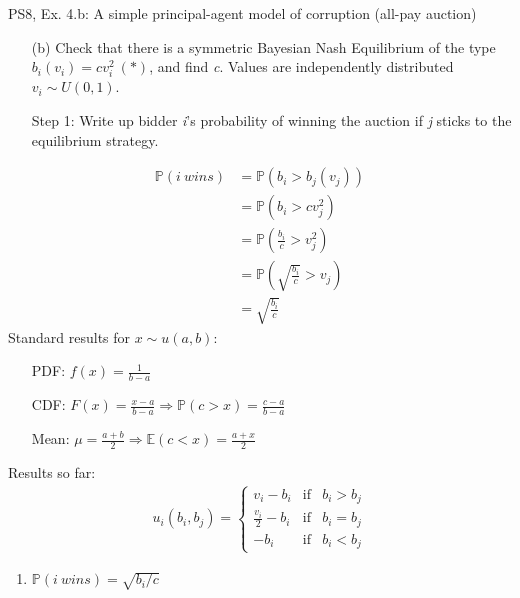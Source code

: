 \begin{frame}{PS8, Ex. 4.b: A simple principal-agent model of corruption (all-pay auction)}
    \begin{itemize}
      \item[(b)] Check that there is a symmetric Bayesian Nash Equilibrium of the type $b_i(v_i) = cv_i^2\ (*)$, and find \textit{c}. Values are independently distributed $v_i\sim U(0, 1)$.
    \end{itemize} \vspace{-8pt}
    \begin{multicols}{2}
      \begin{itemize}
        \item[Step 1:] Write up bidder \textit{i}'s probability of winning the auction if \textit{j} sticks to the equilibrium strategy.
      \end{itemize} \vspace{-8pt}
      \begin{align*}
        \mathbb{P}(i\ wins)&=\mathbb{P}(b_i>b_j(v_j))\\
                           &=\mathbb{P}(b_i>cv_j^2)\\
                           &=\mathbb{P}\left(\frac{b_i}{c}>v_j^2\right)\\
                           &=\mathbb{P}\left(\sqrt{\frac{b_i}{c}}>v_j\right)\\
                           &=\sqrt{\frac{b_i}{c}}
      \end{align*}
      \vfill\null\columnbreak
      Standard results for $x\sim u(a, b):$ \vspace{-6pt}
      \begin{itemize}
        \item[PDF:] $f(x)=\frac{1}{b-a}$
        \item[CDF:] $F(x)=\frac{x-a}{b-a}\Rightarrow\mathbb{P}(c>x)=\frac{c-a}{b-a}$
        \item[Mean:] $\mu=\frac{a+b}{2}\Rightarrow\mathbb{E}(c<x)=\frac{a+x}{2}$
      \end{itemize}
      \vspace{-6pt}
      Results so far: \vspace{-6pt}
      \begin{align*}
        u_i(b_i,b_j)=\left\{\begin{array}{lcl}
          v_i-b_i           & \text{if} & b_i>b_j \\
          \frac{v_i}{2}-b_i & \text{if} & b_i=b_j \\
          -b_i              & \text{if} & b_i<b_j
        \end{array}\right.
      \end{align*} \vspace{-16pt}
      \begin{enumerate}
        \item $\mathbb{P}(i\ wins)=\sqrt{b_i/c}$
      \end{enumerate}
      \vfill\null
    \end{multicols}
\end{frame}
